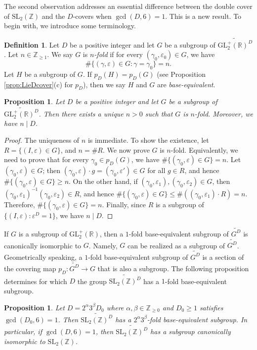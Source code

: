 \documentclass[12pt]{amsart}
\numberwithin{equation}{section}
\theoremstyle{plain}
\newtheorem{prop}[thm]{Proposition}
\theoremstyle{definition}
\newtheorem{deff}[thm]{Definition}
\theoremstyle{remark}
\newcommand\numgeq[2]{\mathbb{#1}_{\geq #2}}
\newcommand\slZ{\mathrm{SL}_2(\mathbb{Z})}
\newcommand\glpR{\mathrm{GL}_2^{+}(\mathbb{R})}
\newcommand\Dcover[2]{\widetilde{#1^{#2}}}
\begin{document}
\begin{appendix}
The second observation addresses an essential difference between the double cover of $\slZ$ and the $D$-covers when $\gcd(D,6)=1$. This is a new result. To begin with, we introduce some terminology.
\begin{deff}
Let $D$ be a positive integer and let $G$ be a subgroup of $\Dcover{\glpR}{D}$. Let $n\in\numgeq{Z}{1}$. We say $G$ is \emph{$n$-fold} if for every $(\gamma_0,\varepsilon_0)\in G$, we have
\begin{equation*}
\#\{(\gamma,\varepsilon)\in G\colon\gamma=\gamma_0\}=n.
\end{equation*}
Let $H$ be a subgroup of $G$. If $p_D(H)=p_D(G)$ (see Proposition \ref{prop:LieDcover}(c) for $p_D$), then we say $H$ and $G$ are \emph{base-equivalent}.
\end{deff}
\begin{prop}
Let $D$ be a positive integer and let $G$ be a subgroup of $\Dcover{\glpR}{D}$. Then there exists a unique $n>0$ such that $G$ is $n$-fold. Moreover, we have $n\mid D$.
\end{prop}
\begin{proof}
The uniqueness of $n$ is immediate. To show the existence, let $R=\{(I,\varepsilon)\in G\}$, and $n=\#R$. We now prove $G$ is $n$-fold. Equivalently, we need to prove that for every $\gamma_0\in p_D(G)$, we have $\#\{(\gamma_0,\varepsilon)\in G\}=n$. Let $(\gamma_0,\varepsilon)\in G$; then $(\gamma_0,\varepsilon)\cdot g=(\gamma_0,\varepsilon')\in G$ for all $g\in R$, and hence $\#\{(\gamma_0,\varepsilon)\in G\}\geq n$. On the other hand, if $(\gamma_0,\varepsilon_1), (\gamma_0,\varepsilon_2)\in G$, then $(\gamma_0,\varepsilon_1)^{-1}(\gamma_0,\varepsilon_2)\in R$, and hence $\#\{(\gamma_0,\varepsilon)\in G\}\leq\#((\gamma_0,\varepsilon_1)\cdot R)=n$. Therefore, $\#\{(\gamma_0,\varepsilon)\in G\}=n$. Finally, since $R$ is a subgroup of $\{(I,\varepsilon)\colon\varepsilon^D=1\}$, we have $n\mid D$.
\end{proof}

If $G$ is a subgroup of $\glpR$, then a $1$-fold base-equivalent subgroup of $\Dcover{G}{D}$ is canonically isomorphic to $G$. Namely, $G$ can be realized as a subgroup of $\Dcover{G}{D}$. Geometrically speaking, a $1$-fold base-equivalent subgroup of $\Dcover{G}{D}$ is a section of the covering map $p_D\colon\Dcover{G}{D}\rightarrow G$ that is also a subgroup. The following proposition determines for which $D$ the group $\Dcover{\slZ}{D}$ has a $1$-fold base-equivalent subgroup.
\begin{prop}
\label{prop:basisequisubgroup}
Let $D=2^\alpha3^\beta D_0$ where $\alpha,\beta\in\numgeq{Z}{0}$ and $D_0\geq1$ satisfies $\gcd(D_0,6)=1$. Then $\Dcover{\slZ}{D}$ has a $2^\alpha3^\beta$-fold base-equivalent subgroup. In particular, if $\gcd(D,6)=1$, then $\Dcover{\slZ}{D}$ has a subgroup canonically isomorphic to $\slZ$.
\end{prop}


\end{appendix}
\end{document}
